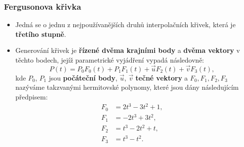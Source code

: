 \subsubsection{Fergusonova křivka}
\begin{itemize}
	\item Jedná se o jednu z nejpoužívanějších druhů interpolačních křivek, která je \textbf{třetího stupně}.
	\item Generování křivek je \textbf{řízené dvěma krajními body} a \textbf{dvěma vektory} v těchto bodech, jejíž parametrické vyjádření vypadá následovně:
	\begin{equation*}
	P(t) = P_0F_0(t) + P_1F_1(t) + \vec{u}F_2(t) + \vec{v}F_3(t),
	\end{equation*}
kde $P_0$, $P_1$ jsou \textbf{počáteční body}, $\vec{u}$, $\vec{v}$ \textbf{tečné vektory} a $F_0, F_1, F_2, F_3$ nazýváme takzvanými hermitovské polynomy, které jsou dány následujícím předpisem:
\begin{equation*}
\begin{split}
F_0 &= 2t^3 - 3t^2 + 1,\\
F_1 &= -2t^3 + 3t^2,\\
F_2 &= t^3 - 2t^2 + t,\\
F_3 &= t^3 - t^2.\\
\end{split}
\end{equation*}


\end{itemize}
